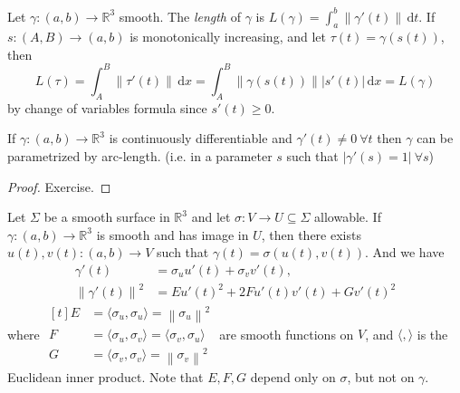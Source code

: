 Let \(\gamma: (a,b) \to \mathbb{R}^3\) smooth. The \textit{length} of \(\gamma\) is \(L(\gamma) = \int_a^b \left\lVert \gamma'(t)\right\rVert\,\mathrm{d}t\). If \(s: (A,B) \to (a,b)\) is monotonically increasing, and let \(\tau(t) = \gamma(s(t))\), then
\[
    L(\tau)=\int_{A}^{B} \left\lVert \tau'(t)\right\rVert \,\mathrm{d}x=\int_{A}^{B}\left\lVert \gamma(s(t))\right\rVert \left\vert s'(t) \right\vert \,\mathrm{d}x = L(\gamma)
\]
by change of variables formula since \(s'(t) \geq 0\).
\begin{lemma}
    If \(\gamma:(a,b)\to \mathbb{R}^3\) is continuously differentiable and \(\gamma'(t)\neq 0~\forall t\) then \(\gamma\) can be parametrized by arc-length. (i.e. in a parameter \(s\) such that \(\left\vert \gamma'(s)=1\right\vert~\forall s\))
\end{lemma}
\begin{proof}
    Exercise.
\end{proof}
Let \(\Sigma\) be a smooth surface in \(\mathbb{R}^3\) and let \(\sigma: V \to U \subseteq \Sigma\) allowable. If \(\gamma: (a,b) \to \mathbb{R}^3\) is smooth and has image in \(U\), then there exists \(u(t), v(t): (a,b) \to V\) such that \(\gamma(t) = \sigma(u(t), v(t))\). And we have
\begin{align*}
    \gamma'(t) &= \sigma_u u'(t)+ \sigma_v v'(t),\\
    \left\lVert \gamma'(t)\right\rVert^2 &= E u'(t)^2 + 2 F u'(t)v'(t) + G v'(t)^2
\end{align*}
where \(\begin{aligned}[t]
    E &= \langle \sigma_u, \sigma_u\rangle = \left\lVert \sigma_u\right\rVert^2\\
    F &= \langle \sigma_u, \sigma_v\rangle = \langle \sigma_v, \sigma_u \rangle\\
    G &= \langle \sigma_v, \sigma_v\rangle = \left\lVert \sigma_v\right\rVert^2
\end{aligned}\) are smooth functions on \(V\), and \(\langle , \rangle\) is the Euclidean inner product. Note that \(E,F,G\) depend only on \(\sigma\), but not on \(\gamma\).


